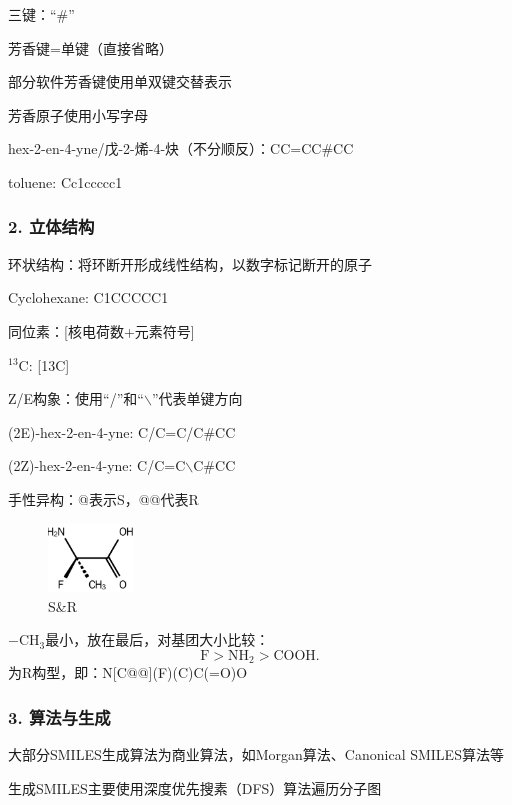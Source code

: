 三键：“\#”

芳香键=单键（直接省略）
\begin{notation}
    部分软件芳香键使用单双键交替表示

    芳香原子使用小写字母
\end{notation}
\begin{eg}
    hex-2-en-4-yne/戊-2-烯-4-炔（不分顺反）：CC=CC\#CC

    toluene: Cc1ccccc1
\end{eg}
\subsubsection*{2. 立体结构}%
\label{subsub:2-立体结构}
环状结构：将环断开形成线性结构，以数字标记断开的原子
\begin{eg}
    Cyclohexane: C1CCCCC1
\end{eg}
同位素：[核电荷数+元素符号]
\begin{eg}
    $^{13}\text{C}$: [13C]
\end{eg}
Z/E构象：使用“/”和“$\backslash$”代表单键方向
\begin{eg}
    (2E)-hex-2-en-4-yne: C/C=C/C\#CC

    (2Z)-hex-2-en-4-yne: C/C=C$\backslash$C\#CC
\end{eg}
手性异构：@表示S，@@代表R
\begin{eg}
\begin{figure}[htpb]
    \centering
    \includegraphics[width=0.2\textwidth]{figures/S&R}
    \caption{S\&R}
    \label{fig:fig-S-R}
\end{figure}
$-\text{CH}_{3}$最小，放在最后，对基团大小比较：
\[
    \text{F}>\text{NH}_{2}>\text{COOH}
.\] 
为R构型，即：N[C@@](F)(C)C(=O)O
\end{eg}
\subsubsection*{3. 算法与生成}%
\label{subsub:3-算法与生成}
\begin{notation}
    大部分SMILES生成算法为商业算法，如Morgan算法、Canonical SMILES算法等

    生成SMILES主要使用深度优先搜素（DFS）算法遍历分子图
\end{notation}


